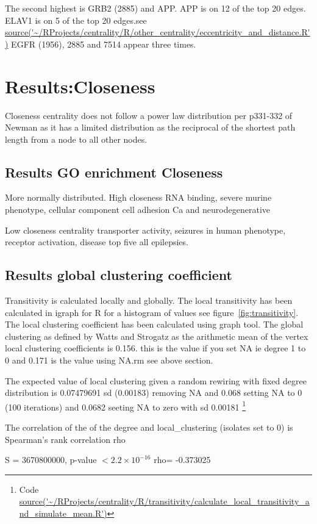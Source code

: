 The second highest is GRB2 (2885) and APP.
APP is on 12 of the top 20 edges. 
ELAV1 is on 5 of the top 20 edges.see \url{source('~/RProjects/centrality/R/other_centrality/eccentricity_and_distance.R')} EGFR (1956), 2885 and 7514 appear three times.

\section{Results:Closeness}
Closeness centrality  does not follow a power law distribution per p331-332 of Newman as it has a limited distribution as the reciprocal of the shortest path length from a node to all other nodes. 
\subsection{Results GO enrichment Closeness}
More normally distributed.
High closeness RNA binding, severe murine phenotype, cellular component cell adhesion
Ca and neurodegenerative

Low closeness centrality transporter activity, seizures in human phenotype, receptor activation, disease top five all epilepsies. 

\subsection{Results global clustering coefficient}
Transitivity is calculated locally and globally. The local transitivity has been calculated in igraph for R for a histogram of values see figure~\ref{fig:transitivity}. The local clustering coefficient has been calculated using graph tool. 
The global clustering as defined by Watts and Strogatz as the arithmetic mean of the vertex local clustering coefficients is 0.156.\cite{watts1998collective} this is the value if you set NA ie degree 1 to 0 and 0.171 is the value using NA.rm see above section. 

The expected value of local clustering given a random rewiring with fixed degree distribution is 0.07479691 sd (0.00183) removing NA and 0.068 setting NA to 0 (100 iterations) and 0.0682 seeting NA to zero with sd 0.00181 \footnote{Code  \url{source('~/RProjects/centrality/R/transitivity/calculate_local_transitivity_and_simulate_mean.R')} }



The correlation of the of the degree and local\_clustering (isolates set to 0)  is 
	Spearman's rank correlation rho

S = 3670800000, p-value $< 2.2 \times 10^{-16}$
      rho= 
-0.373025 

